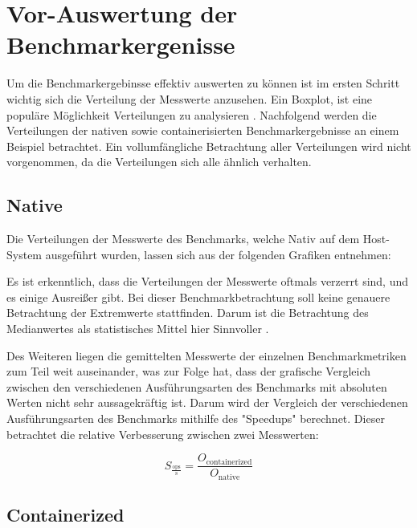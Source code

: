 \section{Vor-Auswertung der Benchmarkergenisse}

Um die Benchmarkergebinsse effektiv auswerten zu können ist im ersten Schritt wichtig sich die Verteilung der Messwerte anzusehen. Ein Boxplot, ist eine populäre Möglichkeit Verteilungen zu analysieren \cite[Vgl. 1]{majawExploringDataDistributions2023}. Nachfolgend werden die Verteilungen der nativen sowie containerisierten Benchmarkergebnisse an einem Beispiel betrachtet. Ein vollumfängliche Betrachtung aller Verteilungen wird nicht vorgenommen, da die Verteilungen sich alle ähnlich verhalten.

\subsection{Native}

Die Verteilungen der Messwerte des Benchmarks, welche Nativ auf dem Host-System ausgeführt wurden, lassen sich aus der folgenden Grafiken entnehmen:


\FloatBarrier

Es ist erkenntlich, dass die Verteilungen der Messwerte oftmals verzerrt sind, und es einige Ausreißer gibt. Bei dieser Benchmarkbetrachtung soll keine genauere Betrachtung der Extremwerte stattfinden. Darum ist die Betrachtung des Medianwertes als statistisches Mittel hier Sinnvoller \cite[Vgl. 15f.]{stengelStatistikUndAufbereitung2011}. 

Des Weiteren liegen die gemittelten Messwerte der einzelnen Benchmarkmetriken zum Teil weit auseinander, was zur Folge hat, dass der grafische Vergleich zwischen den verschiedenen Ausführungsarten des Benchmarks mit absoluten Werten nicht sehr aussagekräftig ist. Darum wird der Vergleich der verschiedenen Ausführungsarten des Benchmarks mithilfe des "Speedups" berechnet. Dieser betrachtet die relative Verbesserung zwischen zwei Messwerten: 


\begin{equation}
S_{\frac{\text{ops}}{\text{s}}} = \frac{O_{\text{containerized}}}{O_{\text{native}}}
\end{equation}


\subsection{Containerized}

